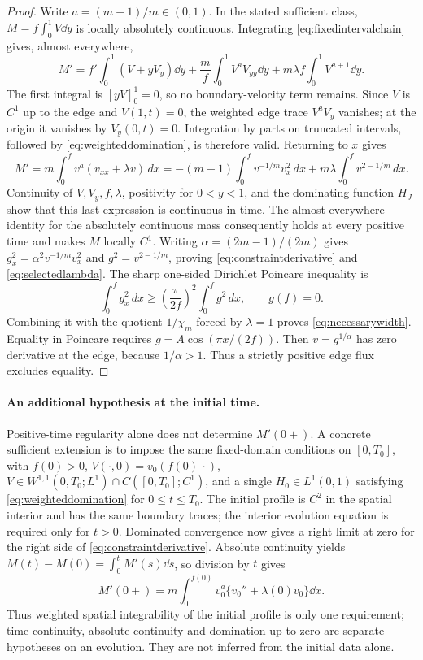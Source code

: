 \documentclass[11pt,a4paper]{article}
\theoremstyle{remark}\newtheorem{remark}[theorem]{Remark}
\begin{document}
\begin{proof}
Write $a=(m-1)/m\in(0,1)$. In the stated sufficient class,
$M=f\int_0^1V\dd y$ is locally absolutely continuous. Integrating
\eqref{eq:fixedintervalchain} gives, almost everywhere,
\[
 M'=f'\int_0^1(V+yV_y)\dd y
       +\frac m f\int_0^1V^aV_{yy}\dd y
       +m\lambda f\int_0^1V^{a+1}\dd y.
\]
The first integral is $[yV]_0^1=0$, so no boundary-velocity term remains.
Since $V$ is $C^1$ up to the edge and $V(1,t)=0$, the weighted edge
trace $V^aV_y$ vanishes; at the origin it vanishes by $V_y(0,t)=0$.
Integration by parts on truncated intervals, followed by
\eqref{eq:weighteddomination}, is therefore valid. Returning to $x$ gives
\[
 M'=m\int_0^f v^a(v_{xx}+\lambda v)\,dx
   =-(m-1)\int_0^f v^{-1/m}v_x^2\,dx
      +m\lambda\int_0^f v^{2-1/m}\,dx.
\]
Continuity of $V,V_y,f,\lambda$, positivity for $0<y<1$, and the
dominating function $H_J$ show that this last expression is continuous
in time. The almost-everywhere identity for the absolutely continuous
mass consequently holds at every positive time and makes $M$ locally
$C^1$.
Writing $\alpha=(2m-1)/(2m)$ gives
$g_x^2=\alpha^2v^{-1/m}v_x^2$ and
$g^2=v^{2-1/m}$, proving \eqref{eq:constraintderivative} and
\eqref{eq:selectedlambda}.
The sharp one-sided Dirichlet Poincare inequality is
\[
 \int_0^f g_x^2\,dx\geq
       \left(\frac\pi{2f}\right)^2\int_0^f g^2\,dx,
 \qquad g(f)=0.
\]
Combining it with the quotient $1/\chi_m$ forced by $\lambda=1$
proves \eqref{eq:necessarywidth}.
Equality in Poincare requires $g=A\cos(\pi x/(2f))$.
Then $v=g^{1/\alpha}$ has zero derivative at the edge, because
$1/\alpha>1$. Thus a strictly positive edge flux excludes equality.
\end{proof}

\paragraph{An additional hypothesis at the initial time.}\label{par:initialregularity}
Positive-time regularity alone does not determine $M'(0+)$. A concrete
sufficient extension is to impose the same fixed-domain conditions on
$[0,T_0]$, with $f(0)>0$, $V(\cdot,0)=v_0(f(0)\,\cdot)$,
$V\in W^{1,1}(0,T_0;L^1)\cap C([0,T_0];C^1)$, and a single
$H_0\in L^1(0,1)$ satisfying \eqref{eq:weighteddomination} for
$0\leq t\leq T_0$. The initial profile is $C^2$ in the spatial
interior and has the same boundary traces; the interior evolution
equation is required only for $t>0$.
Dominated convergence now gives a right limit at zero for the right
side of \eqref{eq:constraintderivative}. Absolute continuity yields
$M(t)-M(0)=\int_0^t M'(s)\dd s$, so division by $t$ gives
\[
 M'(0+)=m\int_0^{f(0)}v_0^a
                  \{v_0''+\lambda(0)v_0\}\dd x.
\]
Thus weighted spatial integrability of the initial profile is only
one requirement; time continuity, absolute continuity and domination
up to zero are separate hypotheses on an evolution. They are not
inferred from the initial data alone.
\end{document}
